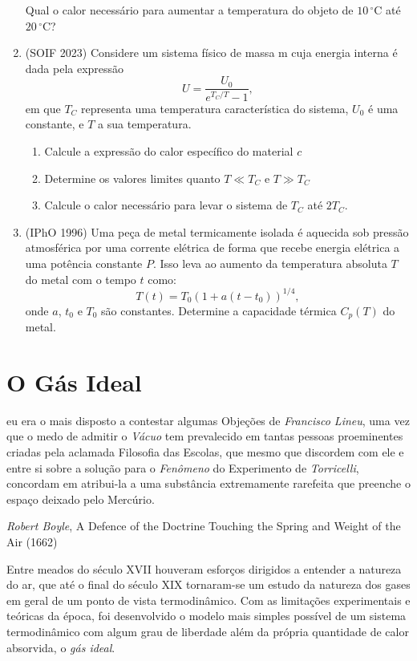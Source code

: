 \documentclass[a4paper, 12pt]{article}
\theoremstyle{definition}
\theoremstyle{definition}
\begin{document}
\begin{enumerate}
    Qual o calor necessário para aumentar a temperatura do objeto de $10\,\mathrm{^\circ C}$ até 
    $20\,\mathrm{^\circ C}$?
    \item (SOIF 2023) Considere um sistema físico de massa m cuja energia interna é dada pela expressão
    $$U=\frac{U_0}{e^{T_C/T}-1},$$
    em que $T_C$ representa uma temperatura característica do sistema, $U_0$ é uma constante, e  $T$ a sua temperatura.
    \begin{enumerate}
        \item Calcule a expressão do calor específico do material $c$ 
        \item Determine os valores limites quanto $T\ll T_C$ e $T\gg T_C$
        \item Calcule o calor necessário para levar o sistema de $T_C$ até $2T_C$.
    \end{enumerate}
    \item (IPhO 1996) Uma peça de metal termicamente isolada é aquecida sob pressão atmosférica por uma corrente
    elétrica de forma que recebe energia elétrica a uma potência constante $P$. Isso leva ao aumento da temperatura
    absoluta $T$ do metal com o tempo $t$ como:
    $$T(t)=T_0\left(1+a\left(t-t_0\right)\right)^{1/4},$$
        onde $a$, $t_0$ e $T_0$ são constantes. Determine a capacidade térmica $C_p(T)$ do metal.
\end{enumerate}


\section{O Gás Ideal}
\epigraph{\justifying [...] eu era o mais disposto a contestar algumas Objeções de 
\textit{Francisco Lineu}, uma vez que o medo de admitir o \textit{Vácuo} tem prevalecido em 
tantas pessoas proeminentes criadas pela aclamada Filosofia das Escolas, que mesmo que discordem 
com ele e entre si sobre a solução para o \textit{Fenômeno} do Experimento de \textit{Torricelli},
concordam em atribui-la a uma substância extremamente rarefeita que preenche o espaço deixado
pelo Mercúrio.}{\textit{Robert Boyle}, A Defence of the Doctrine Touching the Spring and Weight
of the Air (1662)}

\noindent Entre meados do século XVII houveram esforços dirigidos a entender a natureza do ar, que
até o final do século XIX tornaram-se um estudo da natureza dos gases em geral de um ponto de vista
termodinâmico. Com as limitações experimentais e teóricas da época, foi desenvolvido o modelo mais
simples possível de um sistema termodinâmico com algum grau de liberdade além da própria quantidade
de calor absorvida, o \textit{gás ideal}. 
\end{document}
